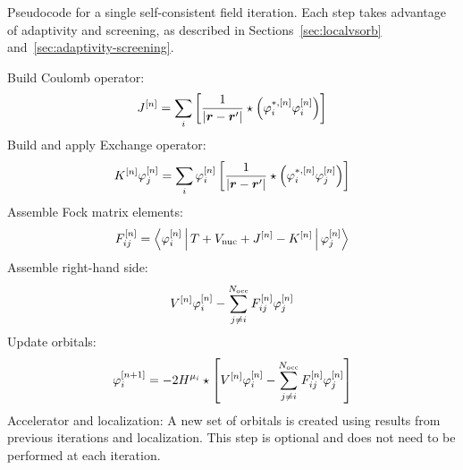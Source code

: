 \documentclass[journal=jctcce, manuscript=article]{achemso}
\begin{document}
\begin{algorithm*}
  \caption{Pseudocode for a single self-consistent field iteration. Each step takes advantage of adaptivity and screening, as described in Sections~\ref{sec:localvsorb} and~\ref{sec:adaptivity-screening}.} 
  \label{alg:SCF-iter}
  \begin{algorithmic}[1]
    
    \State Build Coulomb operator: $$J^{[n]} =
    \sum_i \left[\frac{1}{|\boldsymbol{r} - \boldsymbol{r}^\prime|} \star\left(\varphi_{i}^{*,[n]}\varphi_{i}^{[n]}\right)\right]$$
    \State Build and apply Exchange operator: $$K^{[n]}\varphi_{j}^{[n]} = \sum_i \varphi_{i}^{[n]} \left[\frac{1}{|\boldsymbol{r} - \boldsymbol{r}^\prime|} \star\left(\varphi_{i}^{*,[n]}\varphi_{j}^{[n]}\right)\right]$$
    \State Assemble Fock matrix elements: $$F_{ij}^{[n]} = \Braket{\varphi_{i}^{[n]} | T + V_{\mathrm{nuc}} + J^{[n]} - K^{[n]}| \varphi_{j}^{[n]}}$$
    \State Assemble right-hand side: $$V^{[n]}\varphi_{i}^{[n]} - \sum_{j\neq i}^{N_{\mathrm{occ}}}F_{ij}^{[n]}\varphi_{j}^{[n]}$$
    \State Update orbitals: $$\varphi_{i}^{[n+1]} = -2H^{\mu_{i}}\star\left[ V^{[n]}\varphi_{i}^{[n]} - \sum_{j\neq i}^{N_{\mathrm{occ}}}F_{ij}^{[n]}\varphi_{j}^{[n]}\right]$$
    \State Accelerator and localization: A new set of orbitals is created using results from previous iterations and localization. This step is optional and does not need to be performed at each iteration.
    \EndProcedure
  \end{algorithmic}
\end{algorithm*}
\end{document}
